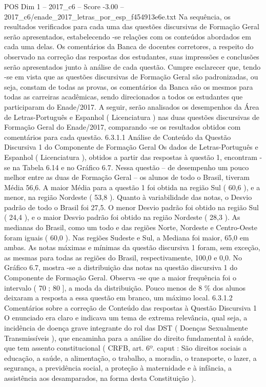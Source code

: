 \begin{textsample}{POS Dim 1 – 2017\_c6 – Score -3.00 – 2017\_c6/enade\_2017\_letras\_por\_esp\_f454913e6e.txt}
Na sequência, os resultados verificados para cada uma das questões discursivas de Formação Geral serão apresentados, estabelecendo -se relações com os conteúdos abordados em cada uma delas.
Os comentários da Banca de docentes corretores, a respeito do observado na correção das respostas dos estudantes, suas impressões e conclusões serão apresentados junto à análise de cada questão.
Cumpre esclarecer que, tendo -se em vista que as questões discursivas de Formação Geral são padronizadas, ou seja, constam de todas as provas, os comentários da Banca são os mesmos para todas as carreiras acadêmicas, sendo direcionados a todos os estudantes que participaram do Enade/2017.
A seguir, serão analisados os desempenhos da Área de Letras-Português e Espanhol ( Licenciatura ) nas duas questões discursivas de Formação Geral do Enade/2017, comparando -se os resultados obtidos com comentários para cada questão. 6.3.1.1 Análise de Conteúdo da Questão Discursiva 1 do Componente de Formação Geral Os dados de Letras-Português e Espanhol ( Licenciatura ), obtidos a partir das respostas à questão 1, encontram -se na Tabela 6.14 e no Gráfico 6.7.
Nessa questão – de desempenho um pouco melhor entre as duas de Formação Geral – os alunos de todo o Brasil, tiveram Média 56,6.
A maior Média para a questão 1 foi obtida na região Sul ( 60,6 ), e a menor, na região Nordeste ( 53,8 ).
Quanto à variabilidade das notas, o Desvio padrão de todo o Brasil foi 27,5.
O menor Desvio padrão foi obtido na região Sul ( 24,4 ), e o maior Desvio padrão foi obtido na região Nordeste ( 28,3 ).
As medianas do Brasil, como um todo e das regiões Norte, Nordeste e Centro-Oeste foram iguais ( 60,0 ).
Nas regiões Sudeste e Sul, a Mediana foi maior, 65,0 em ambas.
As notas máximas e mínimas da questão discursiva 1 foram, sem exceção, as mesmas para todas as regiões do Brasil, respectivamente, 100,0 e 0,0.
No Gráfico 6.7, mostra -se a distribuição das notas na questão discursiva 1 do Componente de Formação Geral.
Observa -se que a maior frequência foi o intervalo ( 70 ; 80 ], a moda da distribuição.
Pouco menos de 8 \% dos alunos deixaram a resposta a essa questão em branco, um máximo local. 6.3.1.2 Comentários sobre a correção de Conteúdo das respostas à Questão Discursiva 1 O enunciado era claro e indicava um tema de extrema relevância, qual seja, a incidência de doença grave integrante do rol das DST ( Doenças Sexualmente Transmissíveis ), que encaminha para a análise do direito fundamental à saúde, que tem assento constitucional ( CRFB, art. 6º. caput : São direitos sociais a educação, a saúde, a alimentação, o trabalho, a moradia, o transporte, o lazer, a segurança, a previdência social, a proteção à maternidade e à infância, a assistência aos desamparados, na forma desta Constituição ).

\end{textsample}
